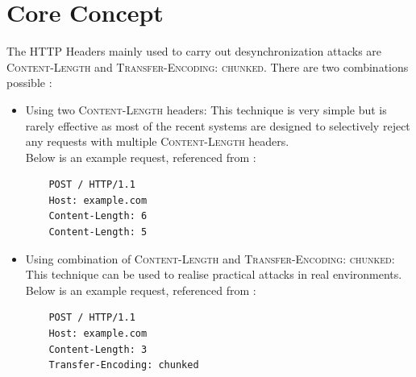 \section{Core Concept}
The HTTP Headers mainly used to carry out desynchronization attacks are \textsc{Content-Length} and \textsc{Transfer-Encoding: chunked}. There are two combinations possible : 
\begin{itemize}
	\item Using two \textsc{Content-Length} headers: This technique is very simple but is rarely effective as most of the recent systems are designed to selectively reject any requests with multiple \textsc{Content-Length} headers.\\
	Below is an example request, referenced from \cite{b6}:
	\begin{verbatim}
	POST / HTTP/1.1
	Host: example.com
	Content-Length: 6
	Content-Length: 5
	\end{verbatim}
	\item  Using combination of \textsc{Content-Length} and \textsc{Transfer-Encoding: chunked}: This technique can be used to realise practical attacks in real environments. 
	Below is an example request, referenced from \cite{b6}:
	\begin{verbatim}
	POST / HTTP/1.1
	Host: example.com
	Content-Length: 3
	Transfer-Encoding: chunked
	\end{verbatim}
\end{itemize}